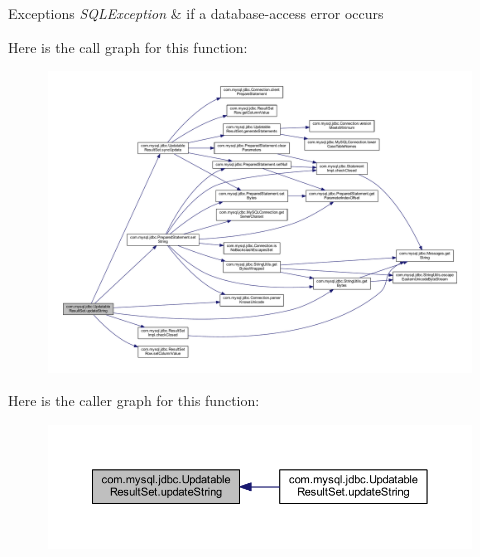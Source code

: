 \begin{DoxyExceptions}{Exceptions}
{\em S\+Q\+L\+Exception} & if a database-\/access error occurs \\
\hline
\end{DoxyExceptions}
Here is the call graph for this function\+:
\nopagebreak
\begin{figure}[H]
\begin{center}
\leavevmode
\includegraphics[width=350pt]{classcom_1_1mysql_1_1jdbc_1_1_updatable_result_set_a2700e7ffdff6222d85545e1cb7019e95_cgraph}
\end{center}
\end{figure}
Here is the caller graph for this function\+:
\nopagebreak
\begin{figure}[H]
\begin{center}
\leavevmode
\includegraphics[width=350pt]{classcom_1_1mysql_1_1jdbc_1_1_updatable_result_set_a2700e7ffdff6222d85545e1cb7019e95_icgraph}
\end{center}
\end{figure}
\mbox{\label{classcom_1_1mysql_1_1jdbc_1_1_updatable_result_set_a2d2c5c76d6479a6c82e680ea1bde42bc}} 
